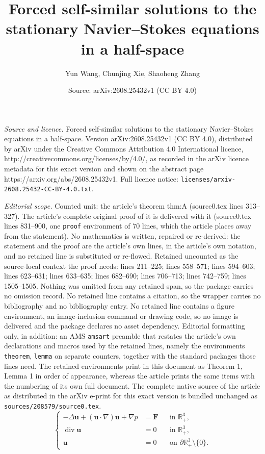 \documentclass[10pt,a4paper]{amsart}
\title{Forced self-similar solutions to the stationary Navier--Stokes equations in a half-space}
\author{Yun Wang, Chunjing Xie, Shaoheng Zhang}
\date{Source: arXiv:2608.25432v1 (CC BY 4.0)}
\newcommand{\BF}{{\boldsymbol{F}}}
\newcommand{\Bu}{{\boldsymbol{u}}}
\begin{document}
\maketitle

\noindent\emph{Source and licence.} Forced self-similar solutions to the stationary Navier--Stokes equations in a half-space. Version arXiv:2608.25432v1 (CC BY 4.0), distributed by arXiv under the Creative Commons Attribution 4.0 International licence, http://creativecommons.org/licenses/by/4.0/, as recorded in the arXiv licence metadata for this exact version and shown on the abstract page https://arxiv.org/abs/2608.25432v1. Full licence notice: \texttt{licenses/arxiv-2608.25432-CC-BY-4.0.txt}.\par\smallskip

\noindent\textit{Editorial scope.} Counted unit: the article's theorem thm:A (source0.tex lines 313--327). The article's complete original proof of it is delivered with it (source0.tex lines 831--900, one \texttt{proof} environment of 70 lines, which the article places away from the statement). No mathematics is written, repaired or re-derived: the statement and the proof are the article's own lines, in the article's own notation, and no retained line is substituted or re-flowed.  Retained uncounted as the source-local context the proof needs: lines 211--225; lines 558--571; lines 594--603; lines 623--631; lines 633--635; lines 682--690; lines 706--713; lines 742--759; lines 1505--1505.  Nothing was omitted from any retained span, so the package carries no omission record.  No retained line contains a citation, so the wrapper carries no bibliography and no bibliography entry.  No retained line contains a figure environment, an image-inclusion command or drawing code, so no image is delivered and the package declares no asset dependency.  Editorial formatting only, in addition: an AMS \texttt{amsart} preamble that restates the article's own declarations and macros used by the retained lines, namely the environments \texttt{theorem}, \texttt{lemma} on separate counters, together with the standard packages those lines need.  The retained environments print in this document as Theorem 1, Lemma 1 in order of appearance, whereas the article prints the same items with the numbering of its own full document.  The complete native source of the article as distributed in the arXiv e-print for this exact version is bundled unchanged as \texttt{sources/208579/source0.tex}.
\begin{equation}\label{eqn:NSEhfD}
	\left\{
	\begin{aligned}
		-\Delta \Bu+(\Bu\cdot\nabla)\Bu+\nabla p
		&=\BF
		&&\text{in }\mathbb R^3_+,\\
		\operatorname{div}\Bu
		&=0
		&&\text{in }\mathbb R^3_+,\\
		\Bu
		&=0
		&&\text{on }\partial\mathbb R^3_+\setminus\{0\}.
	\end{aligned}
	\right.
\end{equation}
\end{document}
